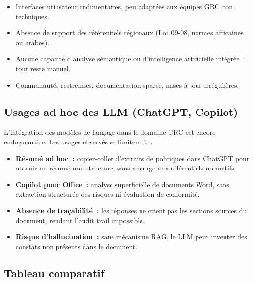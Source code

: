 \documentclass[a4paper,12pt,oneside]{report}
\begin{document}
	\begin{itemize}[leftmargin=1.5em,itemsep=4pt]
		\item Interfaces utilisateur rudimentaires, peu adapt\'ees aux \'equipes
		GRC non techniques.
		\item Absence de support des r\'ef\'erentiels r\'egionaux (Loi~09-08, normes
		africaines ou arabes).
		\item Aucune capacit\'e d'analyse s\'emantique ou d'intelligence artificielle
		int\'egr\'ee~: tout reste manuel.
		\item Communaut\'es restreintes, documentation sparse, mises \`a jour irr\'eguli\`eres.
	\end{itemize}
	
	\subsection{Usages ad hoc des LLM (ChatGPT, Copilot)}
	
	L'int\'egration des mod\`eles de langage dans le domaine GRC est encore embryonnaire.
	Les usages observ\'es se limitent \`a~:
	
	\begin{itemize}[leftmargin=1.5em,itemsep=4pt]
		\item \textbf{R\'esum\'e ad hoc~:} copier-coller d'extraits de politiques dans
		ChatGPT pour obtenir un r\'esum\'e non structur\'e, sans ancrage aux
		r\'ef\'erentiels normatifs.
		\item \textbf{Copilot pour Office~:} analyse superficielle de documents Word,
		sans extraction structur\'ee des risques ni \'evaluation de conformit\'e.
		\item \textbf{Absence de tra\c{c}abilit\'e~:} les r\'eponses ne citent pas les
		sections sources du document, rendant l'audit trail impossible.
		\item \textbf{Risque d'hallucination~:} sans m\'ecanisme RAG, le LLM peut
		inventer des constats non pr\'esents dans le document.
	\end{itemize}
	
	\subsection{Tableau comparatif}
	
\end{document}
